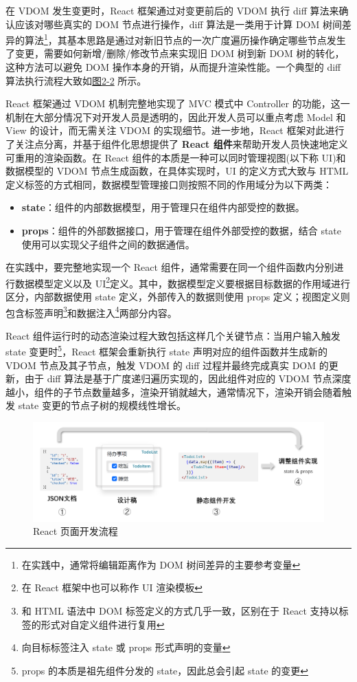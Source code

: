 \documentclass[winfonts,master,twoside]{njuthesis}
\begin{document}
在 VDOM 发生变更时，React 框架通过对变更前后的 VDOM 执行 diff 算法来确认应该对哪些真实的 DOM 节点进行操作，diff 算法是一类用于计算 DOM 树间差异的算法\footnote{在实践中，通常将编辑距离作为 DOM 树间差异的主要参考变量}，其基本思路是通过对新旧节点的一次广度遍历操作确定哪些节点发生了变更，需要如何新增/删除/修改节点来实现旧 DOM 树到新 DOM 树的转化，这种方法可以避免 DOM 操作本身的开销，从而提升渲染性能\cite{leithner2018domdiff}。一个典型的 diff 算法执行流程大致如\hyperref[virtual-dom-runtime]{图2-2} 所示。

React 框架通过 VDOM 机制完整地实现了 MVC 模式中 Controller 的功能，这一机制在大部分情况下对开发人员是透明的，因此开发人员可以重点考虑 Model 和 View 的设计，而无需关注 VDOM 的实现细节。进一步地，React 框架对此进行了关注点分离，并基于组件化思想\cite{heineman2001component}提供了 \textbf{React 组件}来帮助开发人员快速地定义可重用的渲染函数。在 React 组件的本质是一种可以同时管理视图(以下称 UI)和数据模型的 VDOM 节点生成函数，在具体实现时，UI 的定义方式大致与 HTML 定义标签的方式相同，数据模型管理接口则按照不同的作用域分为以下两类：

\begin{itemize}
    \item \textbf{state}：组件的内部数据模型，用于管理只在组件内部受控的数据。
    \item \textbf{props}：组件的外部数据接口，用于管理在组件外部受控的数据，结合 state 使用可以实现父子组件之间的数据通信。
\end{itemize}

在实践中，要完整地实现一个 React 组件，通常需要在同一个组件函数内分别进行数据模型定义以及 UI\footnote{在 React 框架中也可以称作 UI 渲染模板}定义。其中，数据模型定义要根据目标数据的作用域进行区分，内部数据使用 state 定义，外部传入的数据则使用 props 定义；视图定义则包含标签声明\footnote{和 HTML 语法中 DOM 标签定义的方式几乎一致，区别在于 React 支持以标签的形式对自定义组件进行复用}和数据注入\footnote{向目标标签注入 state 或 props 形式声明的变量}两部分内容。

React 组件运行时的动态渲染过程大致包括这样几个关键节点：当用户输入触发 state 变更时\footnote{props 的本质是祖先组件分发的 state，因此总会引起 state 的变更}，React 框架会重新执行 state 声明对应的组件函数并生成新的 VDOM 节点及其子节点，触发 VDOM 的 diff 过程并最终完成真实 DOM 的更新，由于 diff 算法是基于广度递归遍历实现的，因此组件对应的 VDOM 节点深度越小，组件的子节点数量越多，渲染开销就越大，通常情况下，渲染开销会随着触发 state 变更的节点子树的规模线性增长。

\begin{figure}[h]
    \centering
    \includegraphics[width=\textwidth]{figure/chapter-2/react-component-development-pipeline.png}
    \caption{React 页面开发流程}
    \label{react-component-development-pipeline}
\end{figure}
\end{document}
